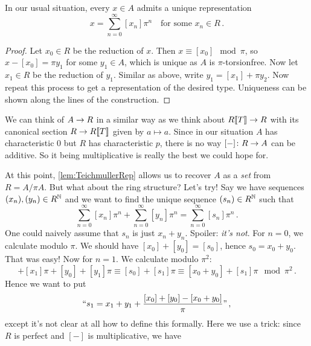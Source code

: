\begin{lem}\label{lem:TeichmullerRep}
	In our usual situation, every $x\in A$ admits a unique representation
	\begin{equation*}
		x=\sum_{n=0}^{\infty}[x_n]\pi^n\quad\text{for some }x_n\in R\,.
	\end{equation*}
\end{lem}
\begin{proof}
	Let $x_0\in R$ be the reduction of $x$. Then $x\equiv[x_0]\mod \pi$, so $x-[x_0]=\pi y_1$ for some $y_1\in A$, which is unique as $A$ is $\pi$-torsionfree. Now let $x_1\in R$ be the reduction of $y_1$. Similar as above, write $y_1=[x_1]+\pi y_2$. Now repeat this process to get a representation of the desired type. Uniqueness can be shown along the lines of the construction.
\end{proof}
\begin{urem}
	We can think of $A\morphism R$ in a similar way as we think about $R\llbracket T\rrbracket\morphism R$ with its canonical section $R\morphism R\llbracket T\rrbracket$ given by $a\mapsto a$. Since in our situation $A$ has characteristic $0$ but $R$ has characteristic $p$, there is no way $[-]\colon R\morphism A$ can be additive. So it being multiplicative is really the best we could hope for.
\end{urem}
At this point, \cref{lem:TeichmullerRep} allows us to recover $A$ as a \emph{set} from $R=A/\pi A$. But what about the ring structure? Let's try! Say we have sequences $(x_n),(y_n)\in R^{\mathbb{N}}$ and we want to find the unique sequence $(s_n)\in R^{\mathbb{N}}$ such that
\begin{equation*}
	\sum_{n=0}^{\infty}[x_n]\pi^n+\sum_{n=0}^{\infty}[y_n]\pi^n=\sum_{n=0}^\infty [s_n]\pi^n\,.
\end{equation*}
One could naively assume that $s_n$ is just $x_n+y_n$. Spoiler: \emph{it's not}. For $n=0$, we calculate modulo $\pi$. We should have $[x_0]+[y_0]=[s_0]$, hence $s_0=x_0+y_0$. That was easy! Now for $n=1$. We calculate modulo $\pi^2$:
\begin{equation*}
	[x_0]+[x_1]\pi+[y_0]+[y_1]\pi\equiv [s_0]+[s_1]\pi\equiv [x_0+y_0]+[s_1]\pi\mod \pi^2\,.
\end{equation*}
Hence we want to put
\begin{equation*}
	``s_1=x_1+y_1+\frac{[x_0]+[y_0]-[x_0+y_0]}{\pi}\text{''}\,,
\end{equation*}
except it's not clear at all how to define this formally. Here we use a trick: since $R$ is perfect and $[-]$ is multiplicative, we have
